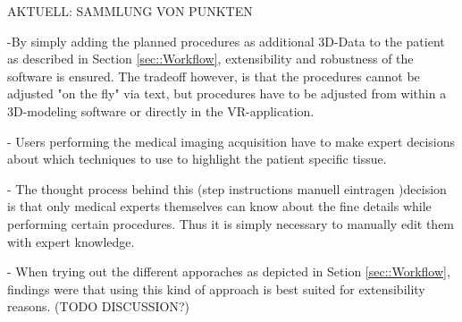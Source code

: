 AKTUELL: SAMMLUNG VON PUNKTEN

-By simply adding the planned procedures as additional 3D-Data to the patient as described in Section \ref{sec::Workflow}, extensibility and robustness of the software is ensured.
The tradeoff however, is that the procedures cannot be adjusted "on the fly" via text, but procedures have to be adjusted from within a 3D-modeling software or directly in the VR-application.

- Users performing the medical imaging acquisition have to make expert decisions about which techniques to use to highlight the patient specific tissue.

- The thought process behind this (step instructions manuell eintragen )decision is that only medical experts themselves can know about the fine details while performing certain procedures.
Thus it is simply necessary to manually edit them with expert knowledge.

- When trying out the different apporaches as depicted in Setion \ref{sec::Workflow}, findings were that using this kind of approach is best suited for extensibility reasons. (TODO DISCUSSION?)

